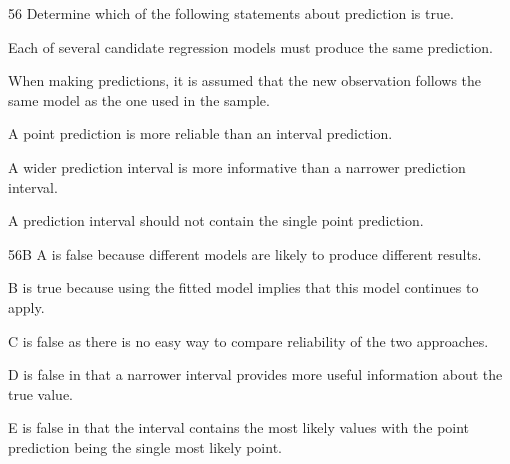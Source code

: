 \begin{question}{56}
Determine which of the following statements about prediction is true.

\begin{choices}
\item Each of several candidate regression models must produce the same prediction.
\item When making predictions, it is assumed that the new observation follows the same model as the one used in the sample.
\item A point prediction is more reliable than an interval prediction.
\item A wider prediction interval is more informative than a narrower prediction interval.
\item A prediction interval should not contain the single point prediction.
\end{choices}
\end{question}
\begin{solution}{56}{B}
A is false because different models are likely to produce different results.

B is true because using the fitted model implies that this model continues to apply.

C is false as there is no easy way to compare reliability of the two approaches.

D is false in that a narrower interval provides more useful information about the true value.

E is false in that the interval contains the most likely values with the point prediction being the single most likely point.
\end{solution}

